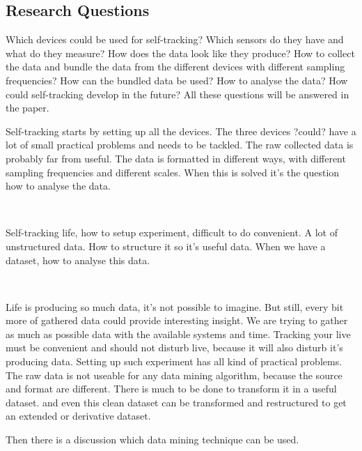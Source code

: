 	\subsection{Research Questions}
		Which devices could be used for self-tracking? Which sensors do they have and what do they measure? How does the data look like they produce?
		How to collect the data and bundle the data from the different devices with different sampling frequencies? How can the bundled data be used?
		How to analyse the data? How could self-tracking develop in the future? All these questions will be answered in the paper.
		
		\iffalse
		Which devices could be used for self-tracking? What do they measure?
		How does the data look like? How to bundle the data? How to deal with different sampling frequencies.
		How can the data be used? 
		How can self-tracking develop in the future.
		
		- State of this generation of sensors
		- Different sample frequency
		- Analyze dataset
		- Future
		\fi

		\iffalse
		Self-tracking starts by setting up all the devices. The three devices ?could? have a lot of small practical problems and needs to be tackled. The raw collected data is probably far from useful. The data is formatted in different ways, with different sampling frequencies and different scales. When this is solved it's the question how to analyse the data.

		\

		Self-tracking life, how to setup experiment, difficult to do convenient. A lot of unstructured data. How to structure it so it's useful data. 
		When we have a dataset, how to analyse this data. 

		\

		Life is producing so much data, it's not possible to imagine. But still, every bit more of gathered data could provide interesting insight. We are trying to gather as much as possible data with the available systems and time. Tracking your live must be convenient and should not disturb live, because it will also disturb it's producing data. Setting up such experiment has all kind of practical problems. The raw data is not useable for any data mining algorithm, because the source and format are different. There is much to be done to transform it in a useful dataset. and even this clean dataset can be transformed and restructured to get an extended or derivative dataset. 

		Then there is a discussion which data mining technique can be used. 


